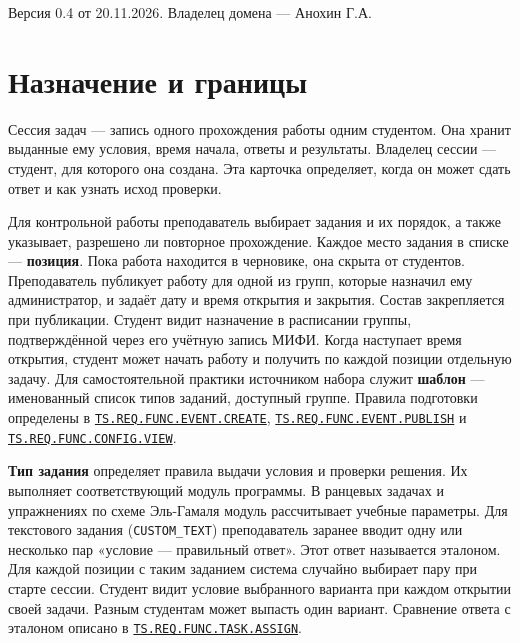 \documentclass[12pt,a4paper]{article}
\begin{document}
\hypertarget{карточка-домена-сессии-задач}{}

Версия 0.4 от 20.11.2026. Владелец домена --- Анохин Г.А.

\section{Назначение и границы}\label{ux43dux430ux437ux43dux430ux447ux435ux43dux438ux435-ux438-ux433ux440ux430ux43dux438ux446ux44b}

\hypertarget{назначение-и-границы}{}

Сессия задач --- запись одного прохождения работы одним студентом. Она хранит выданные ему условия, время начала, ответы и результаты. Владелец сессии --- студент, для которого она создана. Эта карточка определяет, когда он может сдать ответ и как узнать исход проверки.

Для контрольной работы преподаватель выбирает задания и их порядок, а также указывает, разрешено ли повторное прохождение. Каждое место задания в списке --- \textbf{позиция}. Пока работа находится в черновике, она скрыта от студентов. Преподаватель публикует работу для одной из групп, которые назначил ему администратор, и задаёт дату и время открытия и закрытия. Состав закрепляется при публикации. Студент видит назначение в расписании группы, подтверждённой через его учётную запись МИФИ. Когда наступает время открытия, студент может начать работу и получить по каждой позиции отдельную задачу. Для самостоятельной практики источником набора служит \textbf{шаблон} --- именованный список типов заданий, доступный группе. Правила подготовки определены в {\href{../../02\_Техническое\_задание/Техническое\_задание.pdf\#ts-req-func-event-create}{\texttt{TS.\allowbreak{}REQ.\allowbreak{}FUNC.\allowbreak{}EVENT.\allowbreak{}CREATE}}}, {\href{../../02\_Техническое\_задание/Техническое\_задание.pdf\#ts-req-func-event-publish}{\texttt{TS.\allowbreak{}REQ.\allowbreak{}FUNC.\allowbreak{}EVENT.\allowbreak{}PUBLISH}}} и {\href{../../02\_Техническое\_задание/Техническое\_задание.pdf\#ts-req-func-config-view}{\texttt{TS.\allowbreak{}REQ.\allowbreak{}FUNC.\allowbreak{}CONFIG.\allowbreak{}VIEW}}}.

\textbf{Тип задания} определяет правила выдачи условия и проверки решения. Их выполняет соответствующий модуль программы. В ранцевых задачах и упражнениях по схеме Эль-Гамаля модуль рассчитывает учебные параметры. Для текстового задания (\texttt{CUSTOM\_\allowbreak{}TEXT}) преподаватель заранее вводит одну или несколько пар «условие --- правильный ответ». Этот ответ называется эталоном. Для каждой позиции с таким заданием система случайно выбирает пару при старте сессии. Студент видит условие выбранного варианта при каждом открытии своей задачи. Разным студентам может выпасть один вариант. Сравнение ответа с эталоном описано в {\href{../../02\_Техническое\_задание/Техническое\_задание.pdf\#ts-req-func-task-assign}{\texttt{TS.\allowbreak{}REQ.\allowbreak{}FUNC.\allowbreak{}TASK.\allowbreak{}ASSIGN}}}.
\end{document}
